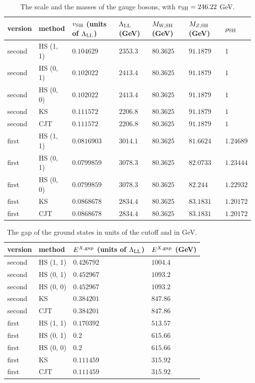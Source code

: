 \documentclass[aps,prd,onecolumn,superscriptaddress,nofootinbib,floatfix,longbibliography]{revtex4-2}
\newcommand{\SH}{{\rm SH}}
\begin{document}
\begin{table}[!htbp]
\caption{\label{tab:scale}The scale and the masses of the gauge bosons, with $v_\SH=246.22$ GeV.}
\begingroup\centering\footnotesize\setlength{\tabcolsep}{4pt}
\begin{tabular}{lllllll}
\hline\hline
version & method & $v_{\rm SH}$ (units of $\Lambda_{\rm LL}$) & $\Lambda_{\rm LL}$ (GeV) & $M_{W,{\rm SH}}$ (GeV) & $M_{Z,{\rm SH}}$ (GeV) & $\rho_{\rm SH}$ \\ \hline
second & HS (1, 1) & $0.104629$ & $2353.3$ & $80.3625$ & $91.1879$ & $1$ \\
second & HS (0, 1) & $0.102022$ & $2413.4$ & $80.3625$ & $91.1879$ & $1$ \\
second & HS (0, 0) & $0.102022$ & $2413.4$ & $80.3625$ & $91.1879$ & $1$ \\
second & KS & $0.111572$ & $2206.8$ & $80.3625$ & $91.1879$ & $1$ \\
second & CJT & $0.111572$ & $2206.8$ & $80.3625$ & $91.1879$ & $1$ \\
first & HS (1, 1) & $0.0816903$ & $3014.1$ & $80.3625$ & $81.6624$ & $1.24689$ \\
first & HS (0, 1) & $0.0799859$ & $3078.3$ & $80.3625$ & $82.0733$ & $1.23444$ \\
first & HS (0, 0) & $0.0799859$ & $3078.3$ & $80.3625$ & $82.244$ & $1.22932$ \\
first & KS & $0.0868678$ & $2834.4$ & $80.3625$ & $83.1831$ & $1.20172$ \\
first & CJT & $0.0868678$ & $2834.4$ & $80.3625$ & $83.1831$ & $1.20172$ \\
\hline\hline
\end{tabular}\par
\endgroup
\end{table}

\begin{table}[!htbp]
\caption{\label{tab:gapgev}The gap of the ground states in units of the cutoff and in GeV.}
\begingroup\centering\footnotesize\setlength{\tabcolsep}{4pt}
\begin{tabular}{llll}
\hline\hline
version & method & $E^{X,{\rm gap}}$ (units of $\Lambda_{\rm LL}$) & $E^{X,{\rm gap}}$ (GeV) \\ \hline
second & HS (1, 1) & $0.426792$ & $1004.4$ \\
second & HS (0, 1) & $0.452967$ & $1093.2$ \\
second & HS (0, 0) & $0.452967$ & $1093.2$ \\
second & KS & $0.384201$ & $847.86$ \\
second & CJT & $0.384201$ & $847.86$ \\
first & HS (1, 1) & $0.170392$ & $513.57$ \\
first & HS (0, 1) & $0.2$ & $615.66$ \\
first & HS (0, 0) & $0.2$ & $615.66$ \\
first & KS & $0.111459$ & $315.92$ \\
first & CJT & $0.111459$ & $315.92$ \\
\hline\hline
\end{tabular}\par
\endgroup
\end{table}
\end{document}
